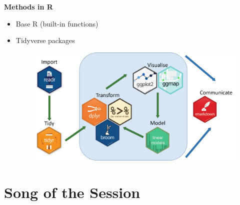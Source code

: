 \documentclass[xcolor=dvipsnames]{beamer}
\begin{document}
\begin{frame}
\frametitle{\insertsectionhead}
\textbf{Methods in R}\\
\begin{itemize}
\item Base R (built-in functions)
\item Tidyverse packages
\begin{figure}
\includegraphics[scale=0.3]{images/tidyverse.png}
\end{figure}
\end{itemize}
\end{frame}

\section{Song of the Session}
\begin{frame}
\frametitle{\insertsectionhead}

\end{frame}
\end{document}
